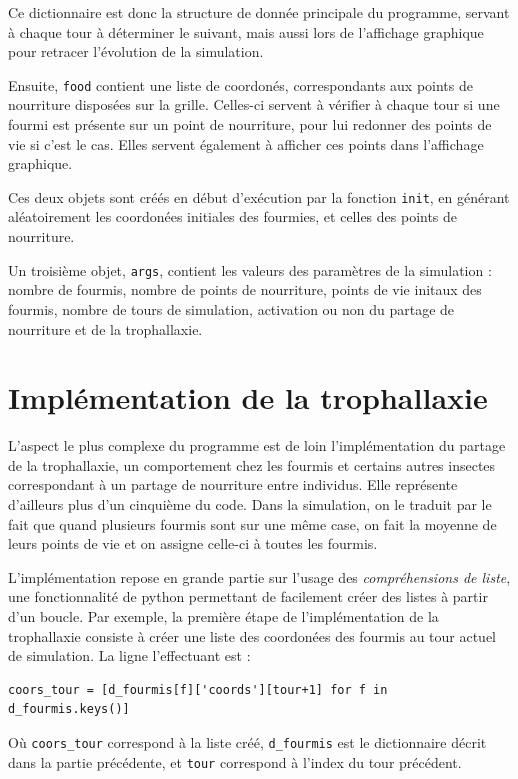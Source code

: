 \documentclass[a4paper,12pt]{article}
\begin{document}
Ce dictionnaire est donc la structure de donnée principale du programme, servant à chaque tour à déterminer le suivant, mais aussi lors de l'affichage graphique pour retracer l'évolution de la simulation.

Ensuite, \verb|food| contient une liste de coordonés, correspondants aux points de nourriture disposées sur la grille. Celles-ci servent à vérifier à chaque tour si une fourmi est présente sur un point de nourriture, pour lui redonner des points de vie si c'est le cas. Elles servent également à afficher ces points dans l'affichage graphique.

Ces deux objets sont créés en début d'exécution par la fonction \verb|init|, en générant aléatoirement les coordonées initiales des fourmies, et celles des points de nourriture.

Un troisième objet, \verb|args|, contient les valeurs des paramètres de la simulation : nombre de fourmis, nombre de points de nourriture, points de vie initaux des fourmis, nombre de tours de simulation, activation ou non du partage de nourriture et de la trophallaxie.

\section{Implémentation de la trophallaxie}

L'aspect le plus complexe du programme est de loin l'implémentation du partage de la trophallaxie, un comportement chez les fourmis et certains autres insectes correspondant à un partage de nourriture entre individus. Elle représente d'ailleurs plus d'un cinquième du code. Dans la simulation, on le traduit par le fait que quand plusieurs fourmis sont sur une même case, on fait la moyenne de leurs points de vie et on assigne celle-ci à toutes les fourmis.

L'implémentation repose en grande partie sur l'usage des \emph{compréhensions de liste}, une fonctionnalité de python permettant de facilement créer des listes à partir d'un boucle. Par exemple, la première étape de l'implémentation de la trophallaxie consiste à créer une liste des coordonées des fourmis au tour actuel de simulation. La ligne l'effectuant est :

\begin{verbatim}
coors_tour = [d_fourmis[f]['coords'][tour+1] for f in d_fourmis.keys()]
\end{verbatim}

Où \verb|coors_tour| correspond à la liste créé, \verb|d_fourmis| est le dictionnaire décrit dans la partie précédente, et \verb|tour| correspond à l'index du tour précédent.
\end{document}
